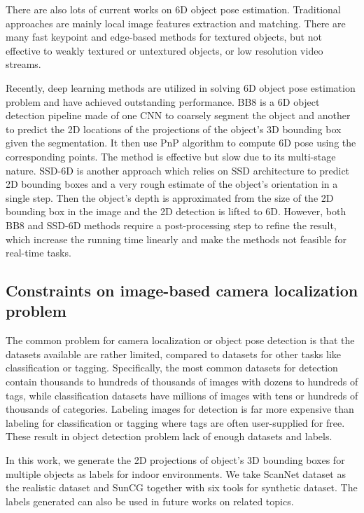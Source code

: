 There are also lots of current works on 6D object pose estimation. Traditional approaches are mainly local image features extraction and matching. There are many fast keypoint and edge-based methods for textured objects, but not effective to weakly textured or untextured objects, or low resolution video streams.

Recently, deep learning methods are utilized in solving 6D object pose estimation problem and have achieved outstanding performance. BB8 \cite{rad2017bb8} is a 6D object detection pipeline made of one CNN to coarsely segment the object and another to predict the 2D locations of the projections of the object's 3D bounding box given the segmentation. It then use PnP algorithm to compute 6D pose using the corresponding points. The method is effective but slow due to its multi-stage nature. SSD-6D \cite{kehl2017ssd} is another approach which relies on SSD architecture to predict 2D bounding boxes and a very rough estimate of the object's orientation in a single step. Then the object's depth is approximated from the size of the 2D bounding box in the image and the 2D detection is lifted to 6D. However, both BB8 and SSD-6D methods require a post-processing step to refine the result, which increase the running time linearly and make the methods not feasible for real-time tasks.

\subsection{Constraints on image-based camera localization problem}

The common problem for camera localization or object pose detection is that the datasets available are rather limited, compared to datasets for other tasks like classification or tagging. Specifically, the most common datasets for detection contain thousands to hundreds of thousands of images with dozens to hundreds of tags, while classification datasets have millions of images with tens or hundreds of thousands of categories. Labeling images for detection is far more expensive than labeling for classification or tagging where tags are often user-supplied for free. These result in object detection problem lack of enough datasets and labels.

In this work, we generate the 2D projections of object's 3D bounding boxes for multiple objects as labels for indoor environments. We take ScanNet dataset as the realistic dataset and SunCG together with six tools for synthetic dataset. The labels generated can also be used in future works on related topics.


